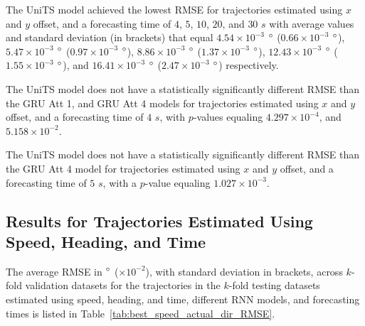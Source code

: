\documentclass[preprint,12pt]{elsarticle}
\begin{document}
The UniTS model achieved the lowest RMSE for trajectories estimated using $x$ and $y$ offset, and a forecasting time of $4$, $5$, $10$, $20$, and $30$ $s$ with average values and standard deviation (in brackets) that equal $4.54 \times 10^{-3}$ $\degree$ ($0.66 \times 10^{-3}$ $\degree$), $5.47 \times 10^{-3}$ $\degree$ ($0.97 \times 10^{-3}$ $\degree$), $8.86 \times 10^{-3}$ $\degree$ ($1.37 \times 10^{-3}$ $\degree$), $12.43 \times 10^{-3}$ $\degree$ ($1.55 \times 10^{-3}$ $\degree$), and $16.41 \times 10^{-3}$ $\degree$ ($2.47 \times 10^{-3}$ $\degree$) respectively.

The UniTS model does not have a statistically significantly different RMSE than the GRU Att 1, and GRU Att 4 models for trajectories estimated using $x$ and $y$ offset, and a forecasting time of $4$ $s$, with $p$-values equaling $4.297 \times 10^{-4}$, and $5.158 \times 10^{-2}$.

The UniTS model does not have a statistically significantly different RMSE than the GRU Att 4 model for trajectories estimated using $x$ and $y$ offset, and a forecasting time of $5$ $s$, with a $p$-value equaling $1.027 \times 10^{-3}$.

\subsection{Results for Trajectories Estimated Using Speed, Heading, and Time}

The average RMSE in $\degree$ ($\times 10^{-2}$), with standard deviation in brackets, across $k$-fold validation datasets for the trajectories in the $k$-fold testing datasets estimated using speed, heading, and time, different RNN models, and forecasting times is listed in Table~\ref{tab:best_speed_actual_dir_RMSE}.
\end{document}
